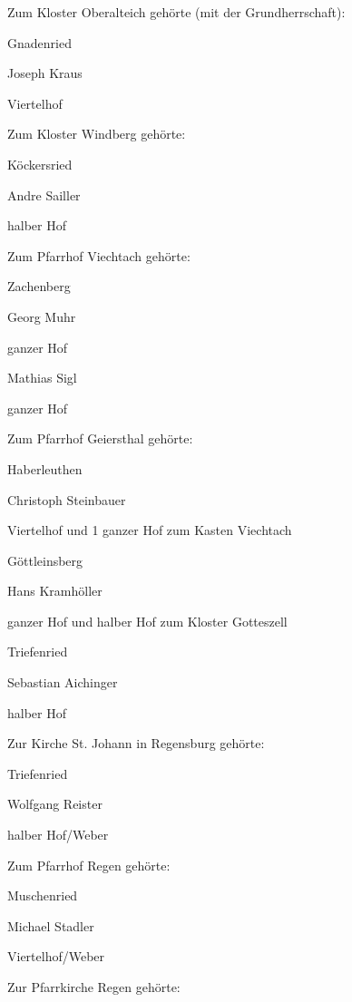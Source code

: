 \documentclass{book}
\begin{document}
Zum Kloster Oberalteich gehörte (mit der Grundherrschaft):



Gnadenried

Joseph Kraus

Viertelhof



Zum Kloster Windberg gehörte:



Köckersried

Andre Sailler

halber Hof



Zum Pfarrhof Viechtach gehörte:



Zachenberg

Georg Muhr

ganzer Hof



Mathias Sigl

ganzer Hof



Zum Pfarrhof Geiersthal gehörte:



Haberleuthen

Christoph Steinbauer

Viertelhof und 1 ganzer Hof zum Kasten Viechtach

Göttleinsberg

Hans Kramhöller

ganzer Hof und halber Hof zum Kloster Gotteszell

Triefenried

Sebastian Aichinger

halber Hof



Zur Kirche St. Johann in Regensburg gehörte:



Triefenried

Wolfgang Reister

halber Hof/Weber



Zum Pfarrhof Regen gehörte:



Muschenried

Michael Stadler

Viertelhof/Weber



Zur Pfarrkirche Regen gehörte:
\end{document}

